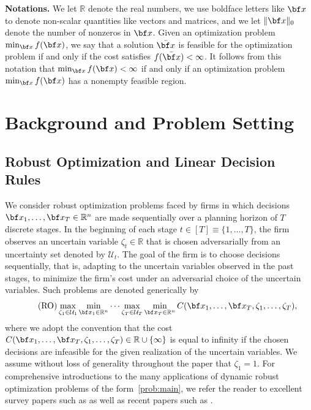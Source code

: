 \documentclass[nonblindrev,mnsc]{informs3} %
\newcommand{\bx}{{\bf x}}
\def\Real{\mathbb{R}}
\let\R\Real
\begin{document}
\textbf{Notations.} We let $\R$ denote the real numbers, we use boldface letters like ${\bx}$ to denote non-scalar quantities like vectors and matrices, and we let $\| {\bx}\|_0$ denote the number of nonzeros in ${\bx}$. Given an optimization problem  $\min_\bx f(\bx)$, we say that a solution $\bar{\bx}$ is feasible for the optimization problem if and only if the cost satisfies $f(\bar{\bx}) < \infty$. It follows from this notation that  $\min_\bx f(\bx) < \infty$ if and only if an optimization problem $\min_\bx f(\bx)$ has a nonempty feasible region. 






\section{Background and Problem Setting} \label{sec:prelim}
\subsection{Robust Optimization and Linear Decision Rules}
We consider robust optimization problems faced by firms in which decisions $\bx_1,\ldots,\bx_T \in \R^n$ are made sequentially over a planning horizon of $T$ discrete stages. In the beginning of each stage $t \in [T] \equiv \{1,\ldots,T\}$, the firm observes an uncertain variable $\zeta_t \in \R$ that is chosen adversarially from  an uncertainty set denoted by $\mathcal{U}_t $. 
 The goal of the firm is to choose decisions sequentially, that is, adapting to the uncertain variables observed in the past stages, to minimize the firm's cost under an adversarial choice of the uncertain variables. Such problems are denoted generically by %
\begin{align} \tag{RO} \label{prob:main}
\max_{\zeta_1 \in \mathcal{U}_1} \min_{\bx_1 \in \R^n}\cdots \max_{\zeta_T \in \mathcal{U}_T} \min_{\bx_T \in \R^n}  C(\bx_1,\ldots,\bx_T,\zeta_1,\ldots,\zeta_T),
\end{align}
where we adopt the convention that the cost 
$C(\bx_1,\ldots,\bx_T,\zeta_1,\ldots,\zeta_T)  \in \R \cup \{ \infty \}$ 
is equal to infinity if the chosen decisions are infeasible for the given realization of the uncertain variables. We  assume without loss of generality throughout the paper that $\zeta_1 = 1$. 
  For comprehensive introductions to the many applications of dynamic robust optimization problems of the form~\eqref{prob:main},  we refer the reader to excellent survey papers such as  \cite{delage2015robust,georghiou2019decision,yanikouglu2019survey,bertsimas2011theory} as well as recent papers such as \cite{postek2023multi,daryalal2023two}. 
  
\end{document}
